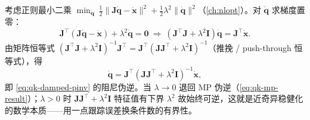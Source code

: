 \begin{derivation}\label{deriv:qk-damped}
考虑正则最小二乘 $\min_{\dot{\boldsymbol{q}}}\ \tfrac12\|\mathbf{J}\dot{\boldsymbol{q}}-\dot{\boldsymbol{x}}\|^2+\tfrac12\lambda^2\|\dot{\boldsymbol{q}}\|^2$（\cref{ch:nlopt}）。对 $\dot{\boldsymbol{q}}$ 求梯度置零：
\[
  \mathbf{J}^\top(\mathbf{J}\dot{\boldsymbol{q}}-\dot{\boldsymbol{x}})+\lambda^2\dot{\boldsymbol{q}}=\mathbf{0}
  \ \Rightarrow\ (\mathbf{J}^\top\mathbf{J}+\lambda^2\mathbf{I})\dot{\boldsymbol{q}}=\mathbf{J}^\top\dot{\boldsymbol{x}}.
\]
由矩阵恒等式 $(\mathbf{J}^\top\mathbf{J}+\lambda^2\mathbf{I})^{-1}\mathbf{J}^\top=\mathbf{J}^\top(\mathbf{J}\mathbf{J}^\top+\lambda^2\mathbf{I})^{-1}$（推挽 / push-through 恒等式），得
\[
  \dot{\boldsymbol{q}}=\mathbf{J}^\top(\mathbf{J}\mathbf{J}^\top+\lambda^2\mathbf{I})^{-1}\dot{\boldsymbol{x}},
\]
即 \cref{eq:qk-damped-pinv} 的阻尼伪逆。当 $\lambda\to0$ 退回 MP 伪逆（\cref{eq:qk-mp-result}）；$\lambda>0$ 时 $\mathbf{J}\mathbf{J}^\top+\lambda^2\mathbf{I}$ 特征值有下界 $\lambda^2$ 故始终可逆，这就是近奇异稳健化的数学本质——用一点跟踪误差换条件数的有界性。
\end{derivation}
